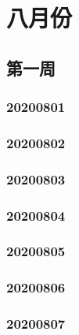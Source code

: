 \chapter{八月份}
  \section{第一周}
  \subsection{20200801}
  
  \subsection{20200802}
  
  \subsection{20200803}
  
  \subsection{20200804}
  
  \subsection{20200805}
  
  \subsection{20200806}
  
  \subsection{20200807}
  
